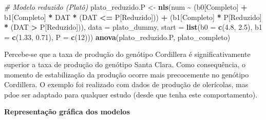 \documentclass[
]{book}
\newenvironment{Shaded}{\begin{snugshade}}{\end{snugshade}}
\newcommand{\CommentTok}[1]{\textcolor[rgb]{0.56,0.35,0.01}{\textit{#1}}}
\newcommand{\DataTypeTok}[1]{\textcolor[rgb]{0.13,0.29,0.53}{#1}}
\newcommand{\DecValTok}[1]{\textcolor[rgb]{0.00,0.00,0.81}{#1}}
\newcommand{\FloatTok}[1]{\textcolor[rgb]{0.00,0.00,0.81}{#1}}
\newcommand{\KeywordTok}[1]{\textcolor[rgb]{0.13,0.29,0.53}{\textbf{#1}}}
\newcommand{\NormalTok}[1]{#1}
\newcommand{\OperatorTok}[1]{\textcolor[rgb]{0.81,0.36,0.00}{\textbf{#1}}}
\newcommand{\StringTok}[1]{\textcolor[rgb]{0.31,0.60,0.02}{#1}}
\numberwithin{equation}{section}
\begin{document}
\begin{Shaded}
\begin{Highlighting}[]
\CommentTok{\# Modelo reduzido (Platô)}
\NormalTok{plato\_reduzido.P \textless{}{-}}\StringTok{ }
\StringTok{  }\KeywordTok{nls}\NormalTok{(num }\OperatorTok{\textasciitilde{}}\StringTok{ }\NormalTok{(b0[Completo] }\OperatorTok{+}\StringTok{ }\NormalTok{b1[Completo] }\OperatorTok{*}\StringTok{ }\NormalTok{DAT }\OperatorTok{*}\StringTok{ }\NormalTok{(DAT }\OperatorTok{\textless{}=}\StringTok{ }\NormalTok{P[Reduzido])) }\OperatorTok{+}\StringTok{ }
\StringTok{        }\NormalTok{(b1[Completo] }\OperatorTok{*}\StringTok{ }\NormalTok{P[Reduzido] }\OperatorTok{*}\StringTok{ }\NormalTok{(DAT }\OperatorTok{\textgreater{}}\StringTok{ }\NormalTok{P[Reduzido])),}
      \DataTypeTok{data =}\NormalTok{ plato\_dummy,}
      \DataTypeTok{start =} \KeywordTok{list}\NormalTok{(}\DataTypeTok{b0 =} \KeywordTok{c}\NormalTok{(}\FloatTok{4.8}\NormalTok{, }\FloatTok{2.5}\NormalTok{), }
                   \DataTypeTok{b1 =} \KeywordTok{c}\NormalTok{(}\FloatTok{1.33}\NormalTok{, }\FloatTok{0.71}\NormalTok{), }
                   \DataTypeTok{P =} \KeywordTok{c}\NormalTok{(}\DecValTok{12}\NormalTok{)))}
\KeywordTok{anova}\NormalTok{(plato\_reduzido.P, plato\_completo)}
\end{Highlighting}
\end{Shaded}

Percebe-se que a taxa de produção do genótipo Cordillera é significativamente superior a taxa de produção do genótipo Santa Clara. Como consequência, o momento de estabilização da produção ocorre mais precocemente no genótipo Cordillera. O exemplo foi realizado com dados de produção de olerícolas, mas pdoe ser adaptado para qualquer estudo (desde que tenha este comportamento).

\textbf{Representação gráfica dos modelos}
\end{document}
